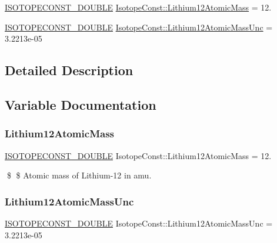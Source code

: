 \begin{DoxyCompactItemize}
\item 
\mbox{\hyperlink{group___isotope_const-_macros_ga8f45a7272ce02c0b4c65c44636ed719a}{I\+S\+O\+T\+O\+P\+E\+C\+O\+N\+S\+T\+\_\+\+D\+O\+U\+B\+LE}} \mbox{\hyperlink{group___isotope_const-_lithium-_li12_gaf6ea30ecc9a5e95ec254d0b4fb1babb8}{Isotope\+Const\+::\+Lithium12\+Atomic\+Mass}} = 12.
\item 
\mbox{\hyperlink{group___isotope_const-_macros_ga8f45a7272ce02c0b4c65c44636ed719a}{I\+S\+O\+T\+O\+P\+E\+C\+O\+N\+S\+T\+\_\+\+D\+O\+U\+B\+LE}} \mbox{\hyperlink{group___isotope_const-_lithium-_li12_gaf5b687c0a5b2027db228f1b7e1fd90f5}{Isotope\+Const\+::\+Lithium12\+Atomic\+Mass\+Unc}} = 3.\+2213e-\/05
\end{DoxyCompactItemize}


\subsection{Detailed Description}


\subsection{Variable Documentation}
\mbox{\label{group___isotope_const-_lithium-_li12_gaf6ea30ecc9a5e95ec254d0b4fb1babb8}} 
\subsubsection{\texorpdfstring{Lithium12\+Atomic\+Mass}{Lithium12AtomicMass}}
{\footnotesize\ttfamily \mbox{\hyperlink{group___isotope_const-_macros_ga8f45a7272ce02c0b4c65c44636ed719a}{I\+S\+O\+T\+O\+P\+E\+C\+O\+N\+S\+T\+\_\+\+D\+O\+U\+B\+LE}} Isotope\+Const\+::\+Lithium12\+Atomic\+Mass = 12.}

\$ \$ Atomic mass of Lithium-\/12 in amu. \mbox{\label{group___isotope_const-_lithium-_li12_gaf5b687c0a5b2027db228f1b7e1fd90f5}} 
\subsubsection{\texorpdfstring{Lithium12\+Atomic\+Mass\+Unc}{Lithium12AtomicMassUnc}}
{\footnotesize\ttfamily \mbox{\hyperlink{group___isotope_const-_macros_ga8f45a7272ce02c0b4c65c44636ed719a}{I\+S\+O\+T\+O\+P\+E\+C\+O\+N\+S\+T\+\_\+\+D\+O\+U\+B\+LE}} Isotope\+Const\+::\+Lithium12\+Atomic\+Mass\+Unc = 3.\+2213e-\/05}

